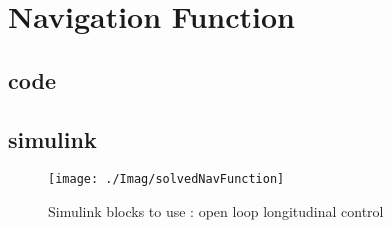 \setcounter{chapter}{3}
\chapter{Navigation Function}
\section{code}
	
	\newpage
	
	

	\begin{landscape}
\section{simulink}
	\begin{figure}[!h]
		\centering
		\texttt{[image: ./Imag/solvedNavFunction]}
		\caption{Simulink blocks to use : open loop longitudinal control}
		\label {fig:NavFunSimulink}
	\end{figure}
	\end{landscape}

